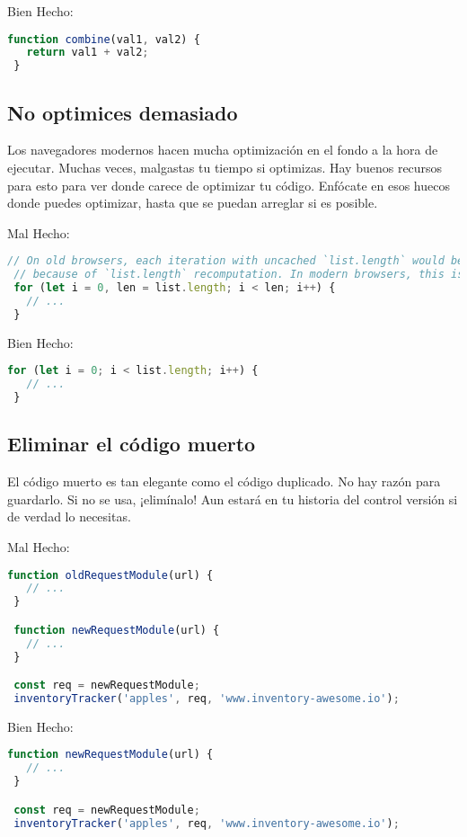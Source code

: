 Bien Hecho:
\begin{lstlisting}[language=TypeScript, style=goodstyle]
 function combine(val1, val2) {
   return val1 + val2;
 }
\end{lstlisting}

\subsection*{No optimices demasiado}

Los navegadores modernos hacen mucha optimización en el fondo a la hora de ejecutar. Muchas veces, malgastas tu tiempo si optimizas. Hay buenos recursos para esto para ver donde carece de optimizar tu código. Enfócate en esos huecos donde puedes optimizar, hasta que se puedan arreglar si es posible.

Mal Hecho:
\begin{lstlisting}[language=TypeScript, style=badstyle]
 // On old browsers, each iteration with uncached `list.length` would be costly
 // because of `list.length` recomputation. In modern browsers, this is optimized.
 for (let i = 0, len = list.length; i < len; i++) {
   // ...
 }
\end{lstlisting}
\vspace{0.5cm} %

Bien Hecho:
\begin{lstlisting}[language=TypeScript, style=goodstyle]
 for (let i = 0; i < list.length; i++) {
   // ...
 }
\end{lstlisting}

\subsection*{Eliminar el código muerto}

El código muerto es tan elegante como el código duplicado. No hay razón para guardarlo. Si no se usa, ¡elimínalo! Aun estará en tu historia del control versión si de verdad lo necesitas.

Mal Hecho:
\begin{lstlisting}[language=TypeScript, style=badstyle]
 function oldRequestModule(url) {
   // ...
 }

 function newRequestModule(url) {
   // ...
 }

 const req = newRequestModule;
 inventoryTracker('apples', req, 'www.inventory-awesome.io');
\end{lstlisting}
\vspace{0.5cm} %

Bien Hecho:
\begin{lstlisting}[language=TypeScript, style=goodstyle]
 function newRequestModule(url) {
   // ...
 }

 const req = newRequestModule;
 inventoryTracker('apples', req, 'www.inventory-awesome.io');
\end{lstlisting}
